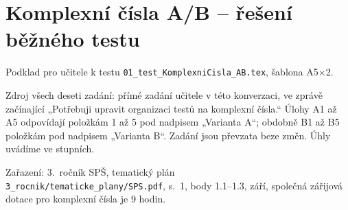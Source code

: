 \documentclass[a4paper,10pt]{article}
\begin{document}
\section*{Komplexní čísla A/B -- řešení běžného testu}
Podklad pro učitele k testu \texttt{01\_test\_KomplexniCisla\_AB.tex}, šablona A5×2.

Zdroj všech deseti zadání: přímé zadání učitele v této konverzaci,
ve zprávě začínající „Potřebuji upravit organizaci testů na komplexní čísla.“
Úlohy A1 až A5 odpovídají položkám 1 až 5 pod nadpisem „Varianta A“;
obdobně B1 až B5 položkám pod nadpisem „Varianta B“.
Zadání jsou převzata beze změn. Úhly uvádíme ve stupních.

Zařazení: 3.~ročník SPŠ, tematický plán\\
\texttt{3\_rocnik/tematicke\_plany/SPS.pdf}, s.~1, body 1.1--1.3,
září, společná zářijová dotace pro komplexní čísla je 9 hodin.
\end{document}
